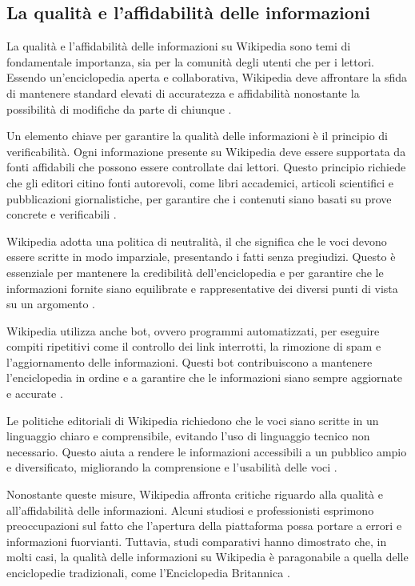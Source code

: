 \documentclass[12pt,a4paper]{report}
\begin{document}
\subsection{La qualità e l'affidabilità delle informazioni}

La qualità e l'affidabilità delle informazioni su Wikipedia sono temi di fondamentale importanza, sia per la comunità degli utenti che per i lettori. Essendo un'enciclopedia aperta e collaborativa, Wikipedia deve affrontare la sfida di mantenere standard elevati di accuratezza e affidabilità nonostante la possibilità di modifiche da parte di chiunque \cite{reagle2010good}.

Un elemento chiave per garantire la qualità delle informazioni è il principio di verificabilità. Ogni informazione presente su Wikipedia deve essere supportata da fonti affidabili che possono essere controllate dai lettori. Questo principio richiede che gli editori citino fonti autorevoli, come libri accademici, articoli scientifici e pubblicazioni giornalistiche, per garantire che i contenuti siano basati su prove concrete e verificabili \cite{denning2005wikipedia}.

Wikipedia adotta una politica di neutralità, il che significa che le voci devono essere scritte in modo imparziale, presentando i fatti senza pregiudizi. Questo è essenziale per mantenere la credibilità dell'enciclopedia e per garantire che le informazioni fornite siano equilibrate e rappresentative dei diversi punti di vista su un argomento \cite{reagle2010good}.

Wikipedia utilizza anche bot, ovvero programmi automatizzati, per eseguire compiti ripetitivi come il controllo dei link interrotti, la rimozione di spam e l'aggiornamento delle informazioni. Questi bot contribuiscono a mantenere l'enciclopedia in ordine e a garantire che le informazioni siano sempre aggiornate e accurate \cite{history_of_wikis}.

Le politiche editoriali di Wikipedia richiedono che le voci siano scritte in un linguaggio chiaro e comprensibile, evitando l'uso di linguaggio tecnico non necessario. Questo aiuta a rendere le informazioni accessibili a un pubblico ampio e diversificato, migliorando la comprensione e l'usabilità delle voci \cite{reagle2010good}.

Nonostante queste misure, Wikipedia affronta critiche riguardo alla qualità e all'affidabilità delle informazioni. Alcuni studiosi e professionisti esprimono preoccupazioni sul fatto che l'apertura della piattaforma possa portare a errori e informazioni fuorvianti. Tuttavia, studi comparativi hanno dimostrato che, in molti casi, la qualità delle informazioni su Wikipedia è paragonabile a quella delle enciclopedie tradizionali, come l'Enciclopedia Britannica \cite{giles2005nature}.
\end{document}
